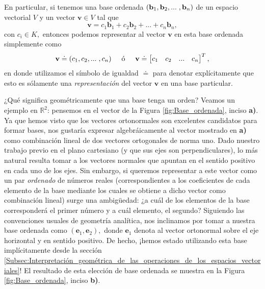 \documentclass[12pt]{article}
\begin{document}
En particular, si tenemos una base ordenada $(\mathbf{b}_1,\mathbf{b}_2,...\hspace{1mm}, \mathbf{b}_n)$ de un espacio vectorial $V$ y un vector $\mathbf{v}\in V$ tal que \[
\mathbf{v} = c_1\mathbf{b}_1+c_2\mathbf{b}_2+...+c_n\mathbf{b}_n,
\] \noindent con $c_i \in K,$ entonces podemos representar al vector $\mathbf{v}$ en esta base ordenada simplemente como $$\mathbf{v}\doteq (c_1,c_2,...\hspace{1mm} ,c_n)\hspace{5mm} \text{ó} \hspace{5mm} \mathbf{v}\doteq \begin{bmatrix} c_1&c_2&...&c_n \end{bmatrix}^T,$$ \noindent en donde utilizamos el símbolo de igualdad $\doteq$ para denotar explícitamente que esto es sólamente una \emph{representación} del vector $\mathbf{v}$ en una base particular. 

¿Qué significa geométricamente que una base tenga un orden? Veamos un ejemplo en $\mathbb{R}^2$: pensemos en el vector de la Figura \ref{fig:Base_ordenada}, inciso \textbf{a)}. Ya que hemos visto que los vectores ortonormales son excelentes candidatos para formar bases, nos gustaría expresar algebráicamente al vector mostrado en \textbf{a)} como combinación lineal de dos vectores ortogonales de norma uno. Dado nuestro trabajo previo en el plano cartesiano (y que sus ejes son perpendiculares), lo más natural resulta tomar a los vectores normales que apuntan en el sentido positivo en cada uno de los ejes. Sin embargo, si queremos representar a este vector como un par \emph{ordenado} de números reales (correspondientes a los coeficientes de cada elemento de la base mediante los cuales se obtiene a dicho vector como combinación lineal) surge una ambigüedad: ¿a cuál de los elementos de la base corresponderá el primer número y a cuál elemento, el segundo? Siguiendo las convenciones usuales de geometría analítica, nos inclinamos por tomar a nuestra base ordenada como $(\mathbf{e}_1,\mathbf{e}_2),$ donde $\mathbf{e}_1$ denota al vector ortonormal sobre el eje horizontal y en sentido positivo. De hecho, ¡hemos estado utilizando esta base implícitamente desde la sección \ref{Subsec:Interpretación_geométrica_de_las_operaciones_de_los_espacios_vectoriales}! El resultado de esta elección de base ordenada se muestra en la Figura \ref{fig:Base_ordenada}, inciso \textbf{b)}.
\end{document}

